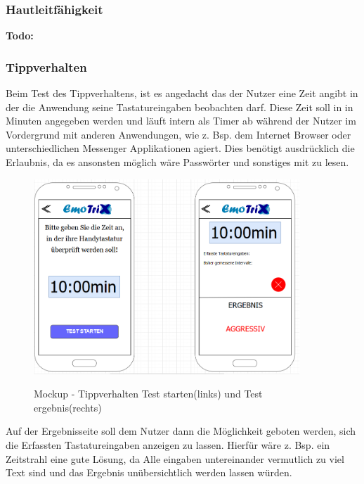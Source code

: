 \subsubsection{Hautleitfähigkeit}
\textbf{Todo:}
\subsubsection{Tippverhalten}
Beim Test des Tippverhaltens, ist es angedacht das der Nutzer eine Zeit angibt in der die Anwendung seine Tastatureingaben beobachten darf. Diese Zeit soll in in Minuten angegeben werden und läuft intern als Timer ab während der Nutzer im Vordergrund mit anderen Anwendungen, wie z. Bsp. dem Internet Browser oder unterschiedlichen Messenger Applikationen agiert. Dies benötigt ausdrücklich die Erlaubnis, da es ansonsten möglich wäre Passwörter und sonstiges mit zu lesen. 
\begin{figure}[h]
	\centering
	\includegraphics[width=10cm]{Bilder/Mockup-Tippverhalten.png}
	\label{img:Mockup-Tippverhalten}
	\caption[Mockup - Tippverhalten Test starten(links) und Test ergebnis(rechts)]{Mockup - Tippverhalten Test starten(links) und Test ergebnis(rechts)}
\end{figure}%
Auf der Ergebnisseite soll dem Nutzer dann die Möglichkeit geboten werden, sich die Erfassten Tastatureingaben anzeigen zu lassen. Hierfür wäre z. Bsp. ein Zeitstrahl eine gute Lösung, da Alle eingaben untereinander vermutlich zu viel Text sind und das Ergebnis unübersichtlich werden lassen würden. 
